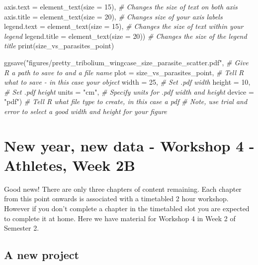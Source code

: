 \documentclass[
]{book}
\newenvironment{Shaded}{\begin{snugshade}}{\end{snugshade}}
\newcommand{\AttributeTok}[1]{\textcolor[rgb]{0.77,0.63,0.00}{#1}}
\newcommand{\CommentTok}[1]{\textcolor[rgb]{0.56,0.35,0.01}{\textit{#1}}}
\newcommand{\DecValTok}[1]{\textcolor[rgb]{0.00,0.00,0.81}{#1}}
\newcommand{\FunctionTok}[1]{\textcolor[rgb]{0.00,0.00,0.00}{#1}}
\newcommand{\NormalTok}[1]{#1}
\newcommand{\StringTok}[1]{\textcolor[rgb]{0.31,0.60,0.02}{#1}}
\begin{document}
\begin{Shaded}
\begin{Highlighting}[]
        \AttributeTok{axis.text =} \FunctionTok{element\_text}\NormalTok{(}\AttributeTok{size =} \DecValTok{15}\NormalTok{), }\CommentTok{\# Changes the size of text on both axis }
        \AttributeTok{axis.title =} \FunctionTok{element\_text}\NormalTok{(}\AttributeTok{size =} \DecValTok{20}\NormalTok{), }\CommentTok{\# Changes size of your axis labels }
        \AttributeTok{legend.text =} \FunctionTok{element\_text}\NormalTok{(}\AttributeTok{size =} \DecValTok{15}\NormalTok{), }\CommentTok{\# Changes the size of text within your legend}
        \AttributeTok{legend.title =} \FunctionTok{element\_text}\NormalTok{(}\AttributeTok{size =} \DecValTok{20}\NormalTok{)) }\CommentTok{\# Changes the size of the legend title  }
\FunctionTok{print}\NormalTok{(size\_vs\_parasites\_point)}

\FunctionTok{ggsave}\NormalTok{(}\StringTok{"figures/pretty\_tribolium\_wingcase\_size\_parasite\_scatter.pdf"}\NormalTok{, }\CommentTok{\# Give R a path to save to and a file name}
       \AttributeTok{plot =}\NormalTok{ size\_vs\_parasites\_point, }\CommentTok{\# Tell R what to save {-} in this case your object}
       \AttributeTok{width =} \DecValTok{25}\NormalTok{, }\CommentTok{\# Set .pdf width}
       \AttributeTok{height =} \DecValTok{10}\NormalTok{, }\CommentTok{\# Set .pdf height}
       \AttributeTok{units =} \StringTok{"cm"}\NormalTok{, }\CommentTok{\# Specify units for .pdf width and height}
       \AttributeTok{device =} \StringTok{"pdf"}\NormalTok{) }\CommentTok{\# Tell R what file type to create, in this case a pdf}
\CommentTok{\# Note, use trial and error to select a good width and height for your figure}
\end{Highlighting}
\end{Shaded}

\hypertarget{data-setup}{%
\chapter{New year, new data - Workshop 4 - Athletes, Week 2B}\label{data-setup}}

Good news! There are only three chapters of content remaining. Each chapter from this point onwards is associated with a timetabled 2 hour workshop. However if you don't complete a chapter in the timetabled slot you are expected to complete it at home. Here we have material for Workshop 4 in Week 2 of Semester 2.

\hypertarget{a-new-project}{%
\section{A new project}\label{a-new-project}}
\end{document}
